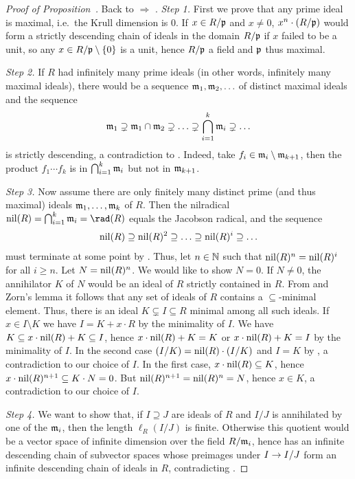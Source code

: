 \documentclass[a4paper,parskip=half,numbers=enddot, DIV=12]{scrreprt}
\begin{document}
\begin{proof}[Proof of Proposition~]
    Back to  $\Rightarrow$ . \emph{Step 1.} First we prove that any prime ideal is maximal, i.e.\ the Krull dimension is $0$. If $x\in R/\mathfrak{p}$ and $x\neq 0$, $x^n\cdot(R/\mathfrak{p})$ would form a strictly descending chain of ideals in the domain $R/\mathfrak{p}$ if $x$ failed to be a unit, so any $x\in R/\mathfrak{p}\setminus\{0\}$ is a unit, hence $R/\mathfrak{p}$ a field and $\mathfrak{p}$ thus maximal. 
    
    \emph{Step 2.} If $R$ had infinitely many prime ideals (in other words, infinitely many maximal ideals), there would be a sequence $\mathfrak{m}_1,\mathfrak{m}_2,\ldots$ of distinct maximal ideals and the sequence
    \begin{align*}
        \mathfrak{m}_1 \supsetneq \mathfrak{m}_1\cap\mathfrak{m}_2\supsetneq \ldots\supsetneq \bigcap_{i=1}^k \mathfrak{m}_i \supsetneq \ldots
    \end{align*}
    is strictly descending, a contradiction to . Indeed, take $f_i\in\mathfrak{m}_i\setminus \mathfrak{m}_{k+1}$, then the product $f_1\cdots f_k$ is in $\bigcap_{i=1}^k\mathfrak{m}_i$ but not in $\mathfrak{m}_{k+1}$.
    
    \emph{Step 3.} Now assume there are only finitely many distinct prime (and thus maximal) ideals $\mathfrak{m}_1, \ldots,\mathfrak{m}_k$ of $R$. Then the nilradical $\nil(R) = \bigcap_{i=1}^k \mm_i=\rad(R)$ equals the Jacobson radical, and the sequence 
    \begin{align*}
    	\operatorname{nil}(R)\supseteq\operatorname{nil}(R)^2\supseteq \ldots\supseteq\operatorname{nil}(R)^i\supseteq\ldots 
    \end{align*}
    must terminate at some point by . Thus, let $n\in\mathbb{N}$ such that $\operatorname{nil}(R)^n = \operatorname{nil}(R)^i$ for all $i\geq n$. Let $N = \operatorname{nil}(R)^n$. We would like to show $N=0$. If $N\neq 0$, the annihilator $K$ of $N$ would be an ideal of $R$ strictly contained in $R$. From  and Zorn's lemma it follows that any set of ideals of $R$ contains a $\subseteq$-minimal element. Thus, there is an ideal $K\subsetneq I\subseteq R$ minimal among all such ideals. If $x\in I\setminus K$ we have $I= K+x\cdot R$ by the minimality of $I$. We have $K\subseteq x\cdot \operatorname{nil}(R) + K \subseteq I$, hence $x\cdot  \operatorname{nil}(R) + K = K$ or $x\cdot \operatorname{nil}(R) +K = I$ by the minimality of $I$. In the second case $(I/K) = \operatorname{nil}(R)\cdot(I/K)$ and $I=K$ by \NAK, a contradiction to our choice of $I$. In the first case, $x\cdot \operatorname{nil}(R) \subseteq K$, hence $x\cdot \operatorname{nil}(R)^{n+1}\subseteq K\cdot N = 0$. But $\operatorname{nil}(R)^{n+1}= \operatorname{nil}(R)^n = N$, hence $x\in K$, a contradiction to our choice of $I$. 
    
    \emph{Step 4.} We want to show that, if $I\supseteq J$ are ideals of $R$ and $I/J$ is annihilated by one of the $\mathfrak{m}_i$, then the length $\ell_R(I/J)$ is finite. Otherwise this quotient would be a vector space of infinite dimension over the field $R/\mathfrak{m}_i$, hence has an infinite descending chain of subvector spaces whose preimages under $I\morphism I/J$ form an infinite descending chain of ideals in $R$, contradicting . 
    

\end{proof}
\end{document}
